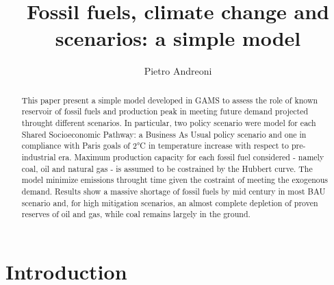\documentclass[11pt]{article} %
\title{Fossil fuels, climate change and scenarios: a simple model}
\author{Pietro Andreoni}
\begin{document}
\maketitle

\begin{abstract}
This paper present a simple model developed in GAMS to assess the role of known reservoir of fossil fuels and production peak in meeting future demand projected throught different scenarios. In particular, two policy scenario were model for each Shared Socioeconomic Pathway: a Business As Usual policy scenario and one in compliance with Paris goals of 2°C in temperature increase with respect to pre-industrial era. Maximum production capacity for each fossil fuel considered - namely coal, oil and natural gas - is assumed to be costrained by the Hubbert curve. 
The model minimize emissions throught time given the costraint of meeting the exogenous demand. Results show a massive shortage of fossil fuels by mid century in most BAU scenario and, for high mitigation scenarios, an almost complete depletion of proven reserves of oil and gas, while coal remains largely in the ground.
\end{abstract}

\tableofcontents

\pagebreak

\section{Introduction} \label{intro}
\end{document}
